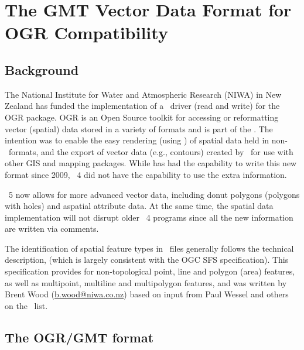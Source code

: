 %
%

\chapter{The GMT Vector Data Format for OGR Compatibility}
\label{app:Q}

\section{Background}
The National Institute for Water and Atmospheric Research (NIWA) in
New Zealand has funded the implementation of a \GMT\ driver (read and
write) for the OGR package. OGR is an Open Source toolkit for accessing
or reformatting vector (spatial) data stored in a variety of formats and
is part of the .
The intention was to enable the easy rendering (using \GMT) of spatial
data held in non-\GMT\ formats, and the export of vector data (e.g.,
contours) created by \GMT\ for use with other GIS and mapping packages.
While  has had the capability to write this new format
since 2009, \GMT\ 4 did not have the capability to use the extra information.

\GMT\ 5 now allows for more advanced vector data, including donut
polygons (polygons with holes) and aspatial attribute data. At the
same time, the spatial data implementation will not disrupt older
\GMT\ 4 programs since all the new information are written via comments.

The identification of spatial feature types in \GMT\ files generally follows the
technical description, (which is largely consistent with the OGC SFS specification).
This specification provides for non-topological point, line and polygon (area)
features, as well as multipoint, multiline and multipolygon features, and was written
by Brent Wood (\href{mailto:b.wood@niwa.co.nz}{b.wood@niwa.co.nz}) based on input
from Paul Wessel and others on the \GMT\ list.

\section{The OGR/GMT format}

